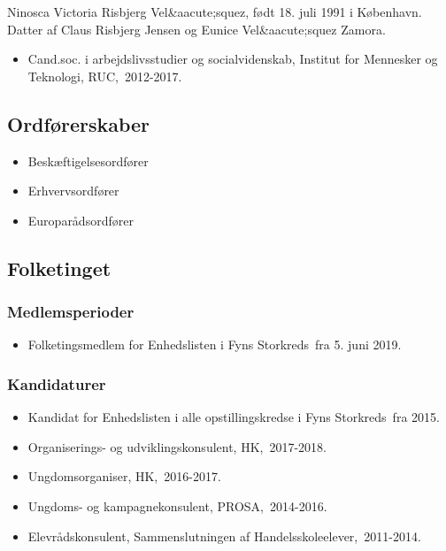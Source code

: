 \documentclass[11pt, a4paper]{awesome-cv}
\begin{document}
\makecvheader[R]
\makelettertitle
\begin{cvletter}
Ninosca Victoria Risbjerg Vel&aacute;squez, født 18. juli 1991 i København. Datter af Claus Risbjerg Jensen og Eunice Vel&aacute;squez Zamora.

\begin{itemize}
\item Cand.soc. i arbejdslivsstudier og socialvidenskab, Institut for Mennesker og Teknologi, RUC, 2012-2017.
\end{itemize}
\subsection*{Ordførerskaber}
\begin{itemize}
\item Beskæftigelsesordfører
\item Erhvervsordfører
\item Europarådsordfører
\end{itemize}
\subsection*{Folketinget}
\subsubsection*{Medlemsperioder}
\begin{itemize}
\item Folketingsmedlem for Enhedslisten i Fyns Storkreds fra 5. juni 2019.
\end{itemize}
\subsubsection*{Kandidaturer}
\begin{itemize}
\item Kandidat for Enhedslisten i alle opstillingskredse i Fyns Storkreds fra 2015.
\end{itemize}
\begin{itemize}
\item Organiserings- og udviklingskonsulent, HK, 2017-2018.
\item Ungdomsorganiser, HK, 2016-2017.
\item Ungdoms- og kampagnekonsulent, PROSA, 2014-2016.
\item Elevrådskonsulent, Sammenslutningen af Handelsskoleelever, 2011-2014.
\end{itemize}
\end{cvletter}
\end{document}
